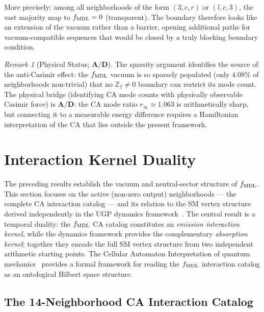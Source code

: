 \documentclass[11pt]{article}
\theoremstyle{remark}
\newtheorem{remark}[theorem]{Remark}
\newcommand{\CatAD}{\textbf{A/D}}
\begin{document}
More precisely: among all neighborhoods of the form
$(3, c, r)$ or $(l, c, 3)$, the vast majority map to
$f_{\rm MDL} = 0$ (transparent).
The boundary therefore looks like an extension of the vacuum rather than
a barrier, opening additional paths for vacuum-compatible sequences that
would be closed by a truly blocking boundary condition.

\begin{remark}[Physical Status; $\CatAD$]
The sparsity argument identifies the source of the anti-Casimir effect:
the $f_{\rm MDL}$ vacuum is so sparsely populated (only $4.08\%$ of
neighborhoods non-trivial) that no $\mathbb{Z}_7 \neq 0$ boundary can
restrict its mode count.
The physical bridge (identifying CA mode counts with physically observable
Casimir force) is $\CatAD$: the CA mode ratio $r_\infty \approx 1.063$
is arithmetically sharp, but connecting it to a measurable energy
difference requires a Hamiltonian interpretation of the CA that lies
outside the present framework.
\end{remark}

\section{Interaction Kernel Duality}
\label{sec:vertex_duality}

The preceding results establish the vacuum and neutral-sector structure of
$f_{\rm MDL}$.
This section focuses on the active (non-zero output) neighborhoods ---
the complete CA interaction catalog --- and its relation to the SM vertex
structure derived independently in the UGP dynamics
framework~\cite{Spivack2026_UGPDynamics}.
The central result is a temporal duality: the $f_{\rm MDL}$ CA catalog
constitutes an \emph{emission interaction kernel}, while the dynamics
framework provides the complementary \emph{absorption kernel}; together
they encode the full SM vertex structure from two independent arithmetic
starting points.
The Cellular Automaton Interpretation of quantum mechanics~\cite{tHooft2016CA}
provides a formal framework for reading the $f_{\rm MDL}$ interaction catalog
as an ontological Hilbert space structure.

\subsection{The 14-Neighborhood CA Interaction Catalog}
\label{sec:catalog}
\end{document}
